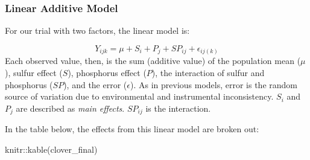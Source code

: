 \documentclass[
]{book}
\newenvironment{Shaded}{\begin{snugshade}}{\end{snugshade}}
\newcommand{\FunctionTok}[1]{\textcolor[rgb]{0.00,0.00,0.00}{#1}}
\newcommand{\NormalTok}[1]{#1}
\newcommand{\SpecialCharTok}[1]{\textcolor[rgb]{0.00,0.00,0.00}{#1}}
\begin{document}
\hypertarget{linear-additive-model-1}{%
\subsubsection{Linear Additive Model}\label{linear-additive-model-1}}

For our trial with two factors, the linear model is:

\[ Y_{ijk} = \mu + S_i + P_j + SP_{ij} + \epsilon_{ij(k)} \]
Each observed value, then, is the sum (additive value) of the population mean (\(\mu\)), sulfur effect (\(S\)), phosphorus effect (\(P\)), the interaction of sulfur and phosphorus (\(SP\)), and the error (\(\epsilon\)). As in previous models, error is the random source of variation due to environmental and instrumental inconsistency. \(S_i\) and \(P_j\) are described as \emph{main effects}. \(SP_{ij}\) is the interaction.

In the table below, the effects from this linear model are broken out:

\begin{Shaded}
\begin{Highlighting}[]
\NormalTok{knitr}\SpecialCharTok{::}\FunctionTok{kable}\NormalTok{(clover\_final)}
\end{Highlighting}
\end{Shaded}
\end{document}
